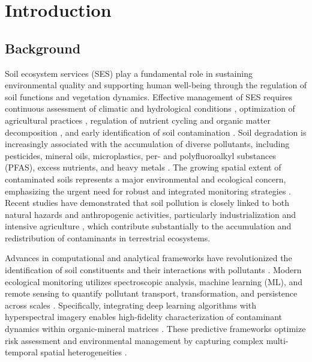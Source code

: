 \documentclass[land,article,submit,pdftex,moreauthors]{Definitions/mdpi}
\begin{document}
\section{Introduction}\label{sec1}

\subsection{Background}\label{sec1.1}

Soil ecosystem services (SES) play a fundamental role in sustaining
environmental quality and supporting human well-being through the regulation
of soil functions and vegetation dynamics. Effective management of SES
requires continuous assessment of climatic and hydrological conditions
\cite{Lal2020,Robinson2014}, optimization of agricultural practices
\cite{Hepperly2009,Rahman2014}, regulation of nutrient cycling and organic
matter decomposition \cite{Atoloye2024,Ma2024,Vishwanath2025}, and early
identification of soil contamination
\cite{Pan2019,Fan2025,Lemenkova2025b,Proshad2025}. Soil degradation is
increasingly associated with the accumulation of diverse pollutants,
including pesticides, mineral oils, microplastics, per- and polyfluoroalkyl
substances (PFAS), excess nutrients, and heavy metals
\cite{Shen2024,Guan2024,Baghaie2020,Luo2017}. The growing spatial extent of
contaminated soils represents a major environmental and ecological concern,
emphasizing the urgent need for robust and integrated monitoring strategies
\cite{Liu2020,Zhang2021,Lemenkova2025d}. Recent studies have demonstrated
that soil pollution is closely linked to both natural hazards and
anthropogenic activities, particularly industrialization
\cite{Rosskopfova2012,Guo2025,Zhang2022} and intensive agriculture
\cite{Hepperly2009,Rahman2014,Pan2019}, which contribute substantially to the
accumulation and redistribution of contaminants in terrestrial ecosystems.

Advances in computational and analytical frameworks have revolutionized the
identification of soil constituents and their interactions with pollutants
\cite{Liu2020,Zhang2021}. Modern ecological monitoring utilizes spectroscopic
analysis, machine learning (ML), and remote sensing to quantify pollutant
transport, transformation, and persistence across scales
\cite{Fan2025,Lemenkova2025d}. Specifically, integrating deep learning
algorithms with hyperspectral imagery enables high-fidelity characterization
of contaminant dynamics within organic-mineral matrices \cite{Xu2026,Li2023}.
These predictive frameworks optimize risk assessment and environmental
management by capturing complex multi-temporal spatial heterogeneities
\cite{Proshad2025,Feng2024}.
\end{document}
